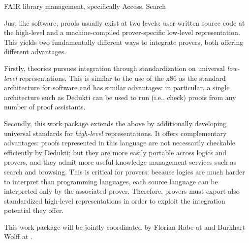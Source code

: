\begin{workpackage}[id=structuring,wphases=0-48,type=RTD,
  short=Structured Theories and Metadata,%
  title=Structured Theories and Metadata,
  lead=Fau,
  BolRM=6,
  TumRM=6,
  FauRM=48,
  SacRM=48]
  



\begin{wpobjectives}
FAIR library management, specifically Access, Search

Just like software, proofs usually exist at two levels: user-written source code at the high-level and a machine-compiled prover-specific low-level representation.
This yields two fundamentally different ways to integrate provers, both offering different advantages.

Firstly, theories pursues integration through standardization on universal \emph{low-level} representations.
This is similar to the use of the x86 as the standard architecture for software and has similar advantages: in particular, a single architecture such as Dedukti can be used to run (i.e., check) proofs from any number of proof assistants.

Secondly, this work package extends the above by additionally developing universal standards for \emph{high-level} representations.
It offers complementary advantages: proofs represented in this language are not necessarily checkable efficiently by Dedukti; but they are more easily portable across logics and provers, and they admit more useful knowledge management services such as search and browsing.
This is critical for provers: because logics are much harder to interpret than programming languages, each source language can be interpreted only by the associated prover.
Therefore, provers must export also standardized high-level representations in order to exploit the integration potential they offer.

This work package will be jointly coordinated by Florian Rabe at  and Burkhart Wolff at .
\end{wpobjectives}



\end{workpackage}
